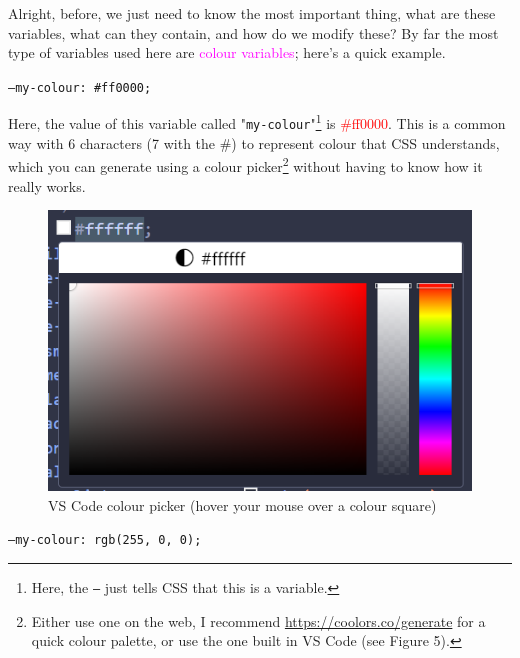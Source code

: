 \documentclass{article}
\begin{document}
Alright, before, we just need to know the most important thing, what are these variables, what can they contain, and how do we modify these?
By far the most type of variables used here are \textcolor{magenta}{colour variables}; here's a quick example.
\begin{tcolorbox}[colback=green!5!white,colframe=green!75!black,title=Hexadecimal colour]
  \texttt{--my-colour: \#ff0000;}
\end{tcolorbox}
\clearpage

Here, the value of this variable called "\texttt{my-colour}"\footnote{Here, the \texttt{--} just tells CSS that this is a variable.} is \textcolor{red}{\#ff0000}. This is a common way with 6 characters (7 with the \#) to represent colour that CSS understands, which you can generate using a colour picker\footnote{Either use one on the web, I recommend \url{https://coolors.co/generate} for a quick colour palette, or use the one built in VS Code (see Figure 5).} without having to know how it really works.

\begin{figure}
    \centering
    \includegraphics[width=1\linewidth]{5.png}
    \caption{VS Code colour picker (hover your mouse over a colour square)}
    \label{fig:enter-label}
\end{figure}

\begin{tcolorbox}[colback=green!5!white,colframe=green!75!black,title=\textcolor{red}{R}\textcolor{green}{G}\textcolor{blue}{B} (\textcolor{red}{Red} \textcolor{green}{Green} \textcolor{blue}{Blue}) colour]
  \texttt{--my-colour: rgb(255, 0, 0);}
\end{tcolorbox}
\end{document}
